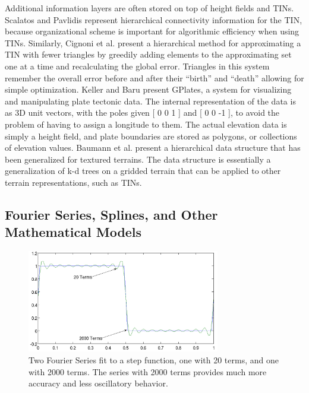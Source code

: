 Additional information layers are often stored on top of height fields and TINs. Scalatos and Pavlidis \cite{Scarlatos:1990:HTU:949531.949559} represent hierarchical connectivity information for the TIN, because organizational scheme is important for algorithmic efficiency when using TINs. Similarly, Cignoni et al. \cite{Cignoni97representationand} present a hierarchical method for approximating a TIN with fewer triangles by greedily adding elements to the approximating set one at a time and recalculating the global error. Triangles in this system remember the overall error before and after their ``birth'' and ``death'' allowing for simple optimization.
Keller and Baru \cite{KellyAndBaru_GPLATES} present GPlates, a system for visualizing and manipulating plate tectonic data. The internal representation of the data is as 3D unit vectors, with the poles given [ 0 0 1 ] and [ 0 0 -1 ], to avoid the problem of having to assign a longitude to them. The actual elevation data is simply a height field, and plate boundaries are stored as polygons, or collections of elevation values. Baumann et al. \cite{Baumann:1999:HHD:792758.793044} present a hierarchical data structure that has been generalized for textured terrains. The data structure is essentially a generalization of k-d trees on a gridded terrain that can be applied to other terrain representations, such as TINs.

\subsection{Fourier Series, Splines, and Other Mathematical Models}


\begin{figure}
  \begin{center}
    \includegraphics[width=0.75\textwidth]{images/FourierSeries_Cropped.png}
  \end{center}
  \caption[Fourier Series]{\label{figure:FourierSeries}Two Fourier Series fit to a step function, one with 20 terms, and one with 2000 terms. The series with 2000 terms provides much more accuracy and less oscillatory behavior.}
\end{figure}

